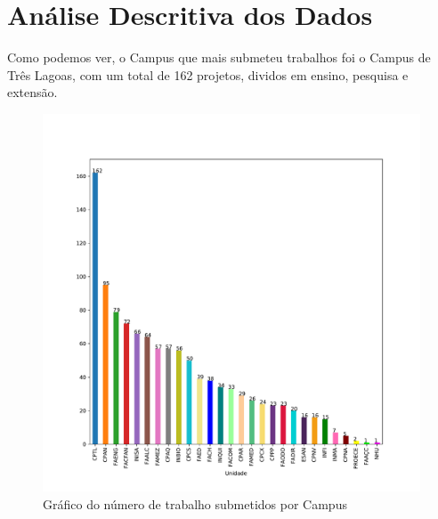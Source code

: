 \documentclass[a4paper, 12pt]{article}
\begin{document}
\section{Análise Descritiva dos Dados}
Como podemos ver, o Campus que mais submeteu trabalhos foi o Campus de Três Lagoas, com um total de 162 projetos, dividos em ensino, pesquisa e extensão.
\vspace{-30pt}
\begin{figure}[h]
	\centering
	\includegraphics[width=1\textwidth]{../img/unidade_bar.pdf}
	\caption{Gráfico do número de trabalho submetidos por Campus}
	\label{}
\end{figure}
\newpage
\end{document}
